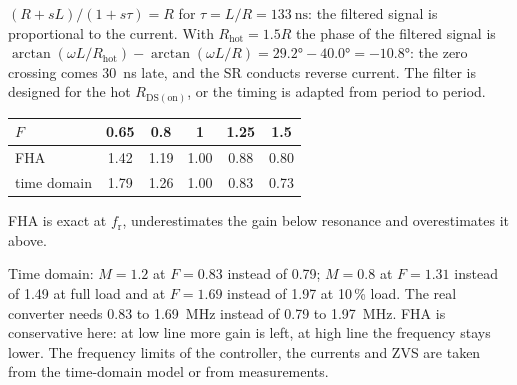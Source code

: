 
\begin{solutionblock}
	$(R+sL)/(1+s\tau)=R$ for $\tau=L/R=\SI{133}{\nano\second}$: the filtered signal is proportional to the current. With $R_\mathrm{hot}=1.5R$ the phase of the filtered signal is $\arctan(\omega L/R_\mathrm{hot})-\arctan(\omega L/R)=\ang{29.2}-\ang{40.0}=\ang{-10.8}$: the zero crossing comes \SI{30}{\nano\second} late, and the SR conducts reverse current. The filter is designed for the hot $R_\mathrm{DS(on)}$, or the timing is adapted from period to period.
\end{solutionblock}




\begin{solutionblock}
	\begin{center}
		\begin{tabular}{|l|c|c|c|c|c|}
			\hline
			$F$           & 0.65 & 0.8  & 1    & 1.25 & 1.5  \\
			\hline
			FHA           & 1.42 & 1.19 & 1.00 & 0.88 & 0.80 \\
			time domain   & 1.79 & 1.26 & 1.00 & 0.83 & 0.73 \\
			\hline
		\end{tabular}
		\label{tab:ex09_exact}
	\end{center}
	FHA is exact at $f_\mathrm{r}$, underestimates the gain below resonance and overestimates it above.
\end{solutionblock}


\begin{solutionblock}
	Time domain: $M=1.2$ at $F=0.83$ instead of 0.79; $M=0.8$ at $F=1.31$ instead of 1.49 at full load and at $F=1.69$ instead of 1.97 at 10\,\% load. The real converter needs 0.83 to \SI{1.69}{\mega\hertz} instead of 0.79 to \SI{1.97}{\mega\hertz}. FHA is conservative here: at low line more gain is left, at high line the frequency stays lower. The frequency limits of the controller, the currents and ZVS are taken from the time-domain model or from measurements.
\end{solutionblock}

